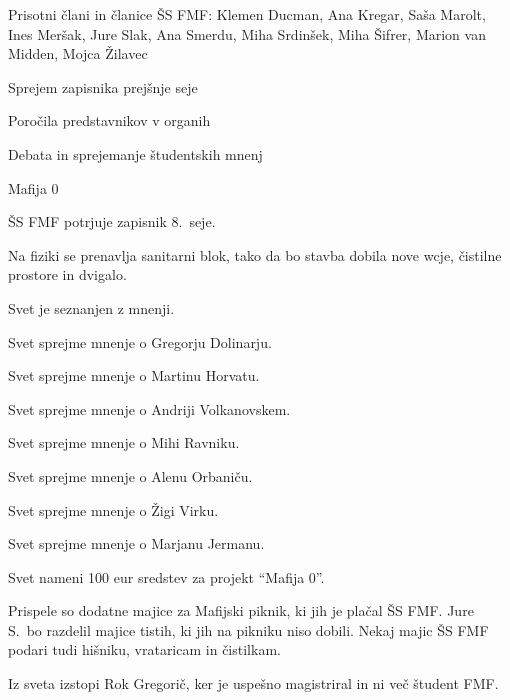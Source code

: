 \documentclass{seja}
\begin{document}
Prisotni člani in članice ŠS FMF: Klemen Ducman, Ana Kregar, Saša Marolt, Ines Meršak, Jure Slak, Ana Smerdu, Miha Srdinšek, Miha Šifrer, Marion van Midden, Mojca Žilavec

\begin{red*}
\item Sprejem zapisnika prejšnje seje
\item Poročila predstavnikov v organih
\item Debata in sprejemanje študentskih mnenj
\item Mafija 0
\end{red*}

\begin{ad}
\item
\begin{sklep*}
  ŠS FMF potrjuje zapisnik 8.~seje.
\end{sklep*}

\item Na fiziki se prenavlja sanitarni blok, tako da bo stavba dobila nove wcje, čistilne prostore in dvigalo.

\item
Svet je seznanjen z mnenji.

\begin{sklep*}
Svet sprejme mnenje o Gregorju Dolinarju.
\end{sklep*}
\begin{sklep*}
Svet sprejme mnenje o Martinu Horvatu.
\end{sklep*}
\begin{sklep*}
Svet sprejme mnenje o Andriji Volkanovskem.
\end{sklep*}
\begin{sklep*}
Svet sprejme mnenje o Mihi Ravniku.
\end{sklep*}
\begin{sklep*}
Svet sprejme mnenje o Alenu Orbaniču.
\end{sklep*}
\begin{sklep*}
Svet sprejme mnenje o Žigi Virku.
\end{sklep*}
\begin{sklep*}
Svet sprejme mnenje o Marjanu Jermanu.
\end{sklep*}

\item
\begin{sklep*}
Svet nameni 100 eur sredstev za projekt ``Mafija 0''.
\end{sklep*}

\item Prispele so dodatne majice za Mafijski piknik, ki jih je plačal ŠS FMF.
Jure S.\ bo razdelil majice tistih, ki jih na pikniku niso dobili.
Nekaj majic ŠS FMF podari tudi hišniku, vrataricam in čistilkam.

Iz sveta izstopi Rok Gregorič, ker je uspešno magistriral in ni več študent FMF.

\end{ad}

\makeatletter \global\let\@enddocumenthook\@empty \makeatother
{}
\end{document}
